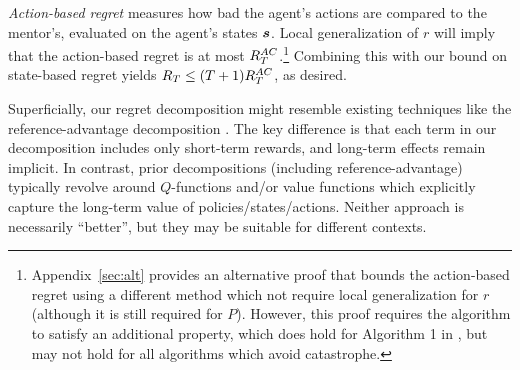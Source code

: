 \emph{Action-based regret} measures how bad the agent's actions are compared to the mentor's, evaluated on the agent's states $\boldsymbol{s}$. Local generalization of $r$ will imply that the action-based regret is at most $R_T^{AC}$.\footnote{Appendix~\ref{sec:alt} provides an alternative proof that bounds the action-based regret using a different method which not require local generalization for $r$ (although it is still required for $P$). However, this proof requires the algorithm to satisfy an additional property, which does hold for Algorithm 1 in \citet{plaut_avoiding_2024}, but may not hold for all algorithms which avoid catastrophe.} Combining this with our bound on state-based regret yields  $R_T \le (T+1)R_T^{AC}$, as desired.

Superficially, our regret decomposition might resemble existing techniques like the reference-advantage decomposition \citep{zhang2020almost}. The key difference is that each term in our decomposition includes only short-term rewards, and long-term effects remain implicit. In contrast, prior decompositions (including reference-advantage) typically revolve around $Q$-functions and/or value functions which explicitly capture the long-term value of policies/states/actions. Neither approach is necessarily ``better'', but they may be suitable for different contexts.

